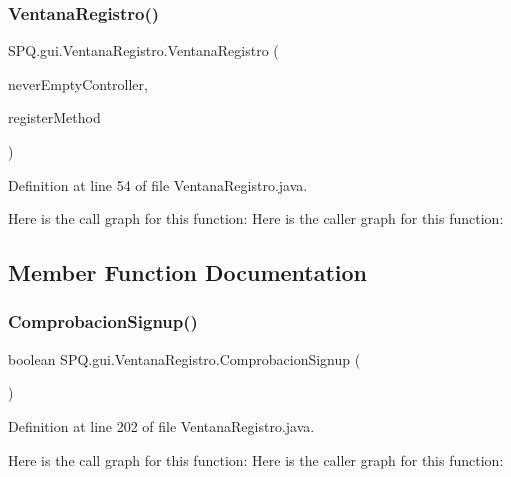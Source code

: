 \subsubsection{\texorpdfstring{Ventana\+Registro()}{VentanaRegistro()}}
{\footnotesize\ttfamily S\+P\+Q.\+gui.\+Ventana\+Registro.\+Ventana\+Registro (\begin{DoxyParamCaption}\item[{\mbox{\hyperlink{class_s_p_q_1_1controller_1_1_never_empty_controller}{Never\+Empty\+Controller}}}]{never\+Empty\+Controller,  }\item[{String}]{register\+Method }\end{DoxyParamCaption})}



Definition at line 54 of file Ventana\+Registro.\+java.

Here is the call graph for this function\+:
Here is the caller graph for this function\+:


\subsection{Member Function Documentation}
\mbox{\label{class_s_p_q_1_1gui_1_1_ventana_registro_a409053f213651ce392699ee8c4f07e66}} 
\subsubsection{\texorpdfstring{Comprobacion\+Signup()}{ComprobacionSignup()}}
{\footnotesize\ttfamily boolean S\+P\+Q.\+gui.\+Ventana\+Registro.\+Comprobacion\+Signup (\begin{DoxyParamCaption}{ }\end{DoxyParamCaption})}



Definition at line 202 of file Ventana\+Registro.\+java.

Here is the call graph for this function\+:
Here is the caller graph for this function\+:
\mbox{\label{class_s_p_q_1_1gui_1_1_ventana_registro_ac33d30ad4e6980a453a3a6c3de20f468}} 
